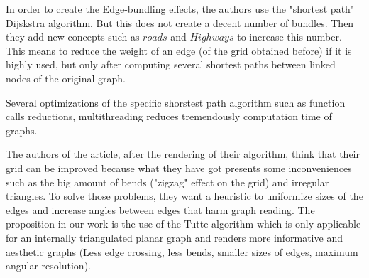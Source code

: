 
In order to create the Edge-bundling effects, the authors use the "shortest path" Dijskstra  algorithm. But this does not create a decent number of bundles. Then they add new concepts such as $roads$ and $Highways$ to increase this number. This means to reduce the weight of an edge (of the grid obtained before) if it is highly used, but only after computing several shortest paths between linked nodes of the original graph. 

  Several optimizations of the specific shorstest path algorithm such as function calls reductions, multithreading reduces tremendously computation time of graphs.


The authors of the article, after the rendering of their algorithm, think that their grid can be improved because what they have got presents some inconveniences such as the big amount of bends ("zigzag" effect on the grid) and irregular triangles. To solve those problems, they want a heuristic to uniformize sizes of the edges and increase angles between edges that harm graph reading. The proposition in our work is the use of  the Tutte algorithm which is only applicable for an internally triangulated planar graph and renders more informative and aesthetic graphs (Less edge crossing, less bends, smaller sizes of edges, maximum angular resolution).
